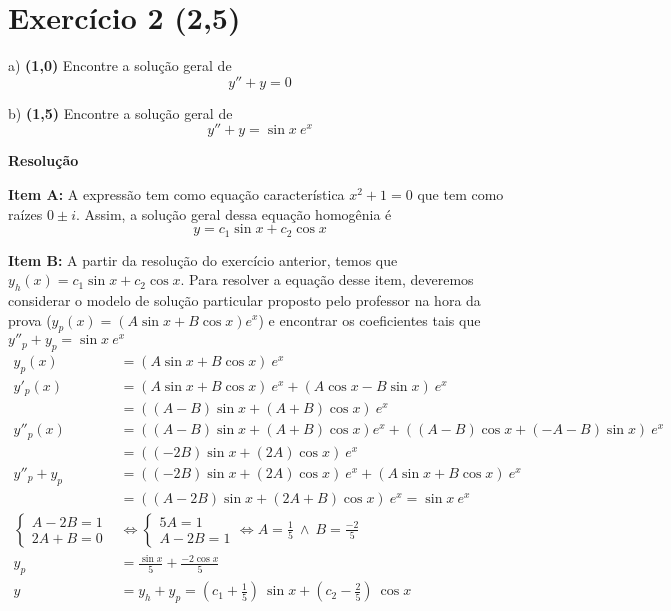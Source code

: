 \documentclass[12pt,openany, letterpaper]{book}
\newcommand{\E}[1]{Exercício #1}
\newcommand{\Resolve}{\begin{center} \textbf{Resolução} \end{center}}
\begin{document}
{{\section*{\E{2} (2,5)}

\hspace{5mm} a) \textbf{(1,0)} Encontre a solução geral de $$y'' + y = 0$$

b) \textbf{(1,5)} Encontre a solução geral de $$y'' + y = \sin x \  e^x$$

\Resolve

\textbf{Item A:} A expressão tem como equação característica $x^2 + 1 = 0$ que tem como raízes $0 \pm i$. Assim, a solução geral dessa equação homogênia é $$y = c_1 \sin x + c_2 \cos x$$

\textbf{Item B:} A partir da resolução do exercício anterior, temos que $y_h(x) = c_1 \sin x + c_2 \cos x$. Para resolver a equação desse item, deveremos considerar o modelo de solução particular proposto pelo professor na hora da prova ($y_p(x) = (A\sin x +  B\cos x)e^x$) e encontrar os coeficientes tais que $y''_p + y_p = \sin x \ e^x$ \begin{align*}
    y_p(x) &= (A\sin x + B\cos x)\ e^x \\
    y'_p(x) &= (A\sin x + B\cos x)\ e^x + (A\cos x - B\sin x)\ e^x \\
    &= ((A-B) \sin x + (A+B) \cos x)\ e^x \\
    y''_p(x) &= ((A-B) \sin x + (A+B) \cos x)e^x + ((A-B) \cos x +
    (-A-B) \sin x)\ e^x \\
    &= ((-2B) \sin x + (2A) \cos x)\ e^x \\
    y''_p + y_p &= ((-2B) \sin x + (2A) \cos x)\ e^x + (A\sin x + B\cos x)\ e^x \\
    &= ((A-2B) \sin x + (2A + B) \cos x)\ e^x = \sin x\ e^x \\
    \begin{cases}
        A - 2B = 1 \\
        2A + B = 0
    \end{cases} &\Longleftrightarrow
    \begin{cases}
        5A = 1 \\
        A - 2B = 1
    \end{cases} \Longleftrightarrow
    A = \frac{1}{5} \ \land \ B = \frac{-2}{5} \\
    y_p &= \frac{\sin x}{5} + \frac{-2 \cos x}{5} \\
    y &= y_h + y_p = \left(c_1 + \frac{1}{5}\right)\ \sin x + \left( c_2 - \frac{2}{5}\right)\ \cos x 
\end{align*}

}}
\end{document}
